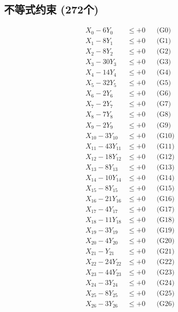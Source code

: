 \documentclass[a4paper,10pt]{article}
\begin{document}
\subsection{不等式约束 (272个)}

\allowdisplaybreaks
{\small
\begin{align}
\allowbreak
X_{0} - 6Y_{0} &\leq +0 && \text{(G0)} \\
X_{1} - 8Y_{1} &\leq +0 && \text{(G1)} \\
X_{2} - 8Y_{2} &\leq +0 && \text{(G2)} \\
X_{3} - 30Y_{3} &\leq +0 && \text{(G3)} \\
\allowbreak
X_{4} - 14Y_{4} &\leq +0 && \text{(G4)} \\
X_{5} - 32Y_{5} &\leq +0 && \text{(G5)} \\
X_{6} - 2Y_{6} &\leq +0 && \text{(G6)} \\
X_{7} - 2Y_{7} &\leq +0 && \text{(G7)} \\
X_{8} - 7Y_{8} &\leq +0 && \text{(G8)} \\
X_{9} - 2Y_{9} &\leq +0 && \text{(G9)} \\
X_{10} - 3Y_{10} &\leq +0 && \text{(G10)} \\
X_{11} - 43Y_{11} &\leq +0 && \text{(G11)} \\
X_{12} - 18Y_{12} &\leq +0 && \text{(G12)} \\
X_{13} - 8Y_{13} &\leq +0 && \text{(G13)} \\
\allowbreak
X_{14} - 10Y_{14} &\leq +0 && \text{(G14)} \\
X_{15} - 8Y_{15} &\leq +0 && \text{(G15)} \\
X_{16} - 21Y_{16} &\leq +0 && \text{(G16)} \\
X_{17} - 4Y_{17} &\leq +0 && \text{(G17)} \\
X_{18} - 11Y_{18} &\leq +0 && \text{(G18)} \\
X_{19} - 3Y_{19} &\leq +0 && \text{(G19)} \\
X_{20} - 4Y_{20} &\leq +0 && \text{(G20)} \\
X_{21} - Y_{21} &\leq +0 && \text{(G21)} \\
X_{22} - 24Y_{22} &\leq +0 && \text{(G22)} \\
X_{23} - 44Y_{23} &\leq +0 && \text{(G23)} \\
\allowbreak
X_{24} - 3Y_{24} &\leq +0 && \text{(G24)} \\
X_{25} - 8Y_{25} &\leq +0 && \text{(G25)} \\
X_{26} - 3Y_{26} &\leq +0 && \text{(G26)} \\

\end{align}}
\end{document}
